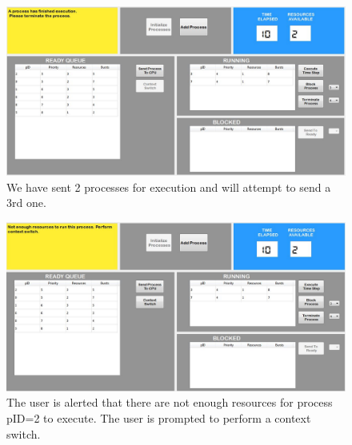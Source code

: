 \documentclass{article}
\begin{document}
\begin{figure}[H]
 \centering
 \includegraphics[height = 9 cm]{ss7.JPG}
 \caption{We have sent 2 processes for execution and will attempt to send a 3rd one.}
\end{figure}

\begin{figure}[H]
 \centering
 \includegraphics[height = 9 cm]{ss8.JPG}
 \caption{The user is alerted that there are not enough resources for process pID=2 to execute. The user is prompted to perform a context switch.}
\end{figure}
\end{document}

